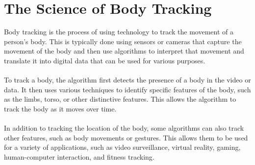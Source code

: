 \section{The Science of Body Tracking}
Body tracking is the process of using technology to track the movement of a person's body.
This is typically done using sensors or cameras that capture the movement of the body and 
then use algorithms to interpret that movement and translate it into digital data that can 
be used for various purposes. 
\\
\\
To track a body, the algorithm first detects the presence of a body in the video or data.
It then uses various techniques to identify specific features of the body, such as the limbs, 
torso, or other distinctive features. This allows the algorithm to track the body as it moves over time. 
\\
\\
In addition to tracking the location of the body, some algorithms can also track 
other features, such as body movements or gestures. This allows them to be used for a 
variety of applications, such as video surveillance, virtual reality, gaming, human-computer 
interaction, and fitness tracking.

